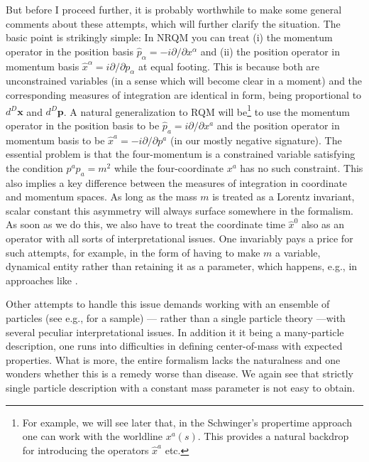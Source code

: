 \documentclass{article}
\begin{document}
But before I proceed further, it is probably worthwhile to make some general comments about these attempts, which will further clarify the situation. The basic point is strikingly simple: In NRQM you can treat (i) the momentum operator in the position basis $\hat p_\alpha=-i\partial/\partial x^\alpha$ and (ii) the position operator in momentum basis $\hat x^\alpha=i\partial/\partial p_\alpha$ at equal footing. This is because both are unconstrained variables (in a sense which will become clear in a moment) and the corresponding measures of integration are identical in form, being proportional to $d^D\bm{x}$ and $d^D\bm{p}$. A natural generalization to RQM will be\footnote{For example, we will see later that, in the Schwinger's propertime approach one can work with the worldline $x^a(s)$. This provides a natural backdrop for introducing  the operators $\hat x^a$ etc.} to use the momentum operator in the position basis to be $\hat p_a=i\partial/\partial x^a$ and  the position operator in momentum basis to be $\hat x^a=-i\partial/\partial p^a$ (in our mostly negative signature). The essential problem is that the four-momentum is a constrained variable satisfying the condition $p^ap_a=m^2$ while the four-coordinate $x^a$ has no such constraint. This also implies a key difference between the measures of integration in coordinate and momentum spaces. As long as the mass $m$ is treated as a Lorentz invariant, scalar constant this asymmetry will always surface somewhere in the formalism.
As soon as we do this, we also have to treat the coordinate time $\hat x^0$ also as an operator with all sorts of interpretational issues. 
One invariably pays a price for such attempts, for example, in the form of having to make $m$ a variable, dynamical entity rather than retaining it as a parameter, which happens, e.g., in approaches like \cite{horwitz}.

Other attempts to handle this issue demands working with an ensemble of particles (see e.g., \cite{many1,many2} for a sample) --- rather than a single particle theory ---with several peculiar interpretational issues. In addition it it being a many-particle description, one runs into difficulties in defining center-of-mass with expected properties. What is more, the entire formalism lacks the naturalness and one wonders whether this is a remedy worse than disease. We again see that strictly single particle description with a constant mass parameter is not easy to obtain.
\end{document}
